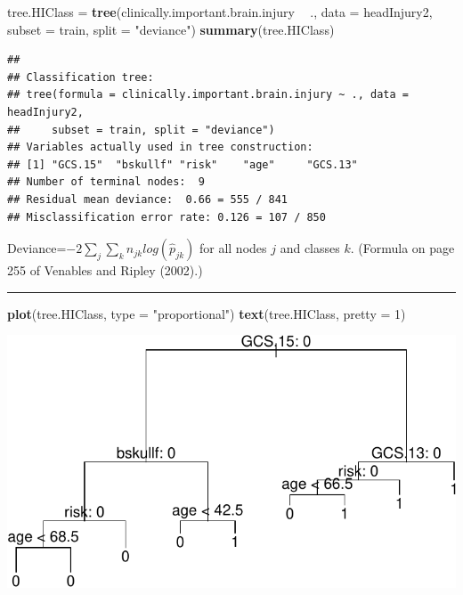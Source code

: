 \documentclass[]{article}
\newenvironment{Shaded}{\begin{snugshade}}{\end{snugshade}}
\newcommand{\DataTypeTok}[1]{\textcolor[rgb]{0.13,0.29,0.53}{#1}}
\newcommand{\DecValTok}[1]{\textcolor[rgb]{0.00,0.00,0.81}{#1}}
\newcommand{\KeywordTok}[1]{\textcolor[rgb]{0.13,0.29,0.53}{\textbf{#1}}}
\newcommand{\NormalTok}[1]{#1}
\newcommand{\OperatorTok}[1]{\textcolor[rgb]{0.81,0.36,0.00}{\textbf{#1}}}
\newcommand{\StringTok}[1]{\textcolor[rgb]{0.31,0.60,0.02}{#1}}
\begin{document}
\footnotesize

\begin{Shaded}
\begin{Highlighting}[]
\NormalTok{tree.HIClass =}\StringTok{ }\KeywordTok{tree}\NormalTok{(clinically.important.brain.injury }\OperatorTok{~}\StringTok{ }\NormalTok{., }\DataTypeTok{data =}\NormalTok{ headInjury2, }
    \DataTypeTok{subset =}\NormalTok{ train, }\DataTypeTok{split =} \StringTok{"deviance"}\NormalTok{)}
\KeywordTok{summary}\NormalTok{(tree.HIClass)}
\end{Highlighting}
\end{Shaded}

\begin{verbatim}
## 
## Classification tree:
## tree(formula = clinically.important.brain.injury ~ ., data = headInjury2, 
##     subset = train, split = "deviance")
## Variables actually used in tree construction:
## [1] "GCS.15"  "bskullf" "risk"    "age"     "GCS.13" 
## Number of terminal nodes:  9 
## Residual mean deviance:  0.66 = 555 / 841 
## Misclassification error rate: 0.126 = 107 / 850
\end{verbatim}

\normalsize

Deviance=\(-2 \sum_{j}\sum_{k}n_{jk}log(\hat{p}_{jk})\) for all nodes
\(j\) and classes \(k\). (Formula on page 255 of Venables and Ripley
(2002).)

\begin{center}\rule{0.5\linewidth}{\linethickness}\end{center}

\begin{Shaded}
\begin{Highlighting}[]
\KeywordTok{plot}\NormalTok{(tree.HIClass, }\DataTypeTok{type =} \StringTok{"proportional"}\NormalTok{)}
\KeywordTok{text}\NormalTok{(tree.HIClass, }\DataTypeTok{pretty =} \DecValTok{1}\NormalTok{)}
\end{Highlighting}
\end{Shaded}

\includegraphics{8Trees_files/figure-latex/unnamed-chunk-13-1.pdf}
\end{document}
